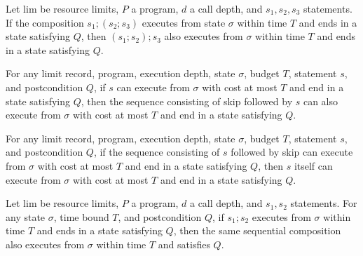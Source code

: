 \begin{theorem}
\label{Light.Ends.seqAssoc}
\leanok
{}
Let $\mathrm{lim}$ be resource limits, $P$ a program, $d$ a call depth, and $s_1,s_2,s_3$
statements. If the composition $s_1;(s_2;s_3)$ executes from state $\sigma$ within time $T$
and ends in a state satisfying $Q$, then $(s_1;s_2);s_3$ also executes from $\sigma$ within
time $T$ and ends in a state satisfying $Q$.
\end{theorem}

\begin{theorem}
\label{Light.Ends.skipThen}
\leanok
{}
For any limit record, program, execution depth, state $\sigma$, budget $T$, statement
$s$, and postcondition $Q$, if $s$ can execute from $\sigma$ with cost at most $T$ and
end in a state satisfying $Q$, then the sequence consisting of skip followed by $s$ can
also execute from $\sigma$ with cost at most $T$ and end in a state satisfying $Q$.
\end{theorem}

\begin{theorem}
\label{Light.Ends.skipLast}
\leanok
{}
For any limit record, program, execution depth, state $\sigma$, budget $T$, statement
$s$, and postcondition $Q$, if the sequence consisting of $s$ followed by skip can
execute from $\sigma$ with cost at most $T$ and end in a state satisfying $Q$, then $s$
itself can execute from $\sigma$ with cost at most $T$ and end in a state satisfying
$Q$.
\end{theorem}

\begin{theorem}
\label{Light.Ends.seqSelf}
\leanok
{}
Let $\mathrm{lim}$ be resource limits, $P$ a program, $d$ a call depth, and $s_1,s_2$
statements. For any state $\sigma$, time bound $T$, and postcondition $Q$, if $s_1;s_2$
executes from $\sigma$ within time $T$ and ends in a state satisfying $Q$, then the same
sequential composition also executes from $\sigma$ within time $T$ and satisfies $Q$.
\end{theorem}

